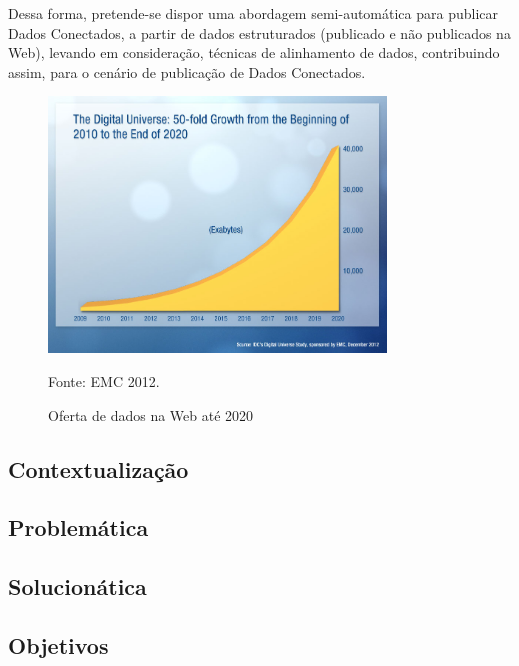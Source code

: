 

Dessa forma, pretende-se dispor uma abordagem semi-automática para publicar Dados Conectados, a partir de dados estruturados (publicado e não publicados na Web), levando em consideração, técnicas de alinhamento de dados, contribuindo assim, para o cenário de publicação de Dados Conectados. 

\begin{figure}[!ht]
	\centering
	\includegraphics[width=0.8\textwidth]{./imagens/oferta.png}\\
    \caption{Oferta de dados na Web até 2020}
	\footnotesize{Fonte: EMC 2012.}
	\label{fig:oferta_2020}
\end{figure}



\subsection*{Contextualização}

\subsection*{Problemática}

\subsection*{Solucionática}

\subsection*{Objetivos}

